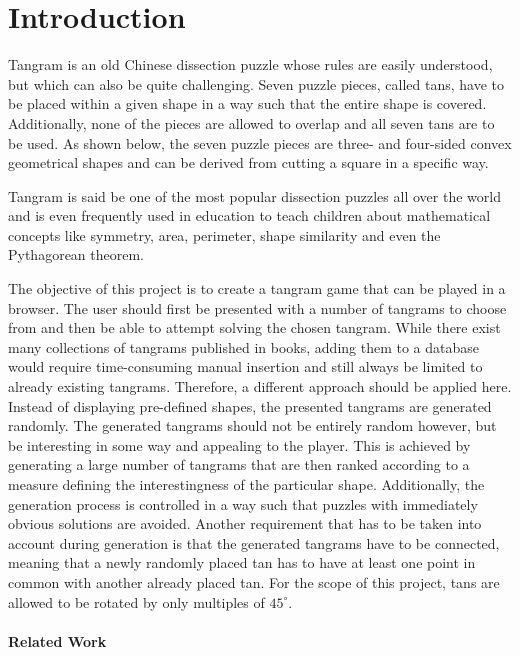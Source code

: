 \chapter{Introduction}\label{chapter:introduction}

Tangram is an old Chinese dissection puzzle whose rules are easily understood, but which can also be quite challenging. Seven puzzle pieces, called tans, have to be placed within a given shape in a way such that the entire shape is covered. Additionally, none of the pieces are allowed to overlap and all seven tans are to be used. As shown below, the seven puzzle pieces are three- and four-sided convex geometrical shapes and can be derived from cutting a square in a specific way.  



Tangram is said be one of the most popular dissection puzzles all over the world and is even frequently used in education to teach children about mathematical concepts like symmetry, area, perimeter, shape similarity and even the Pythagorean theorem. 

The objective of this project is to create a tangram game that can be played in a browser. The user should first be presented with a number of tangrams to choose from and then be able to attempt solving the chosen tangram. 
While there exist many collections of tangrams published in books, adding them to a database would require time-consuming manual insertion and still always be limited to already existing tangrams. Therefore, a different approach should be applied here. Instead of displaying pre-defined shapes, the presented tangrams are generated randomly. The generated tangrams should not be entirely random however, but be interesting in some way and appealing to the player. This is achieved by generating a large number of tangrams that are then ranked according to a measure defining the interestingness of the particular shape. Additionally, the generation process is controlled in a way such that puzzles with immediately obvious solutions are avoided. Another requirement that has to be taken into account during generation is that the generated tangrams have to be connected, meaning that a newly randomly placed tan has to have at least one point in common with another already placed tan. For the scope of this project, tans are allowed to be rotated by only multiples of $45^{\circ}$.

\subsubsection*{Related Work}

